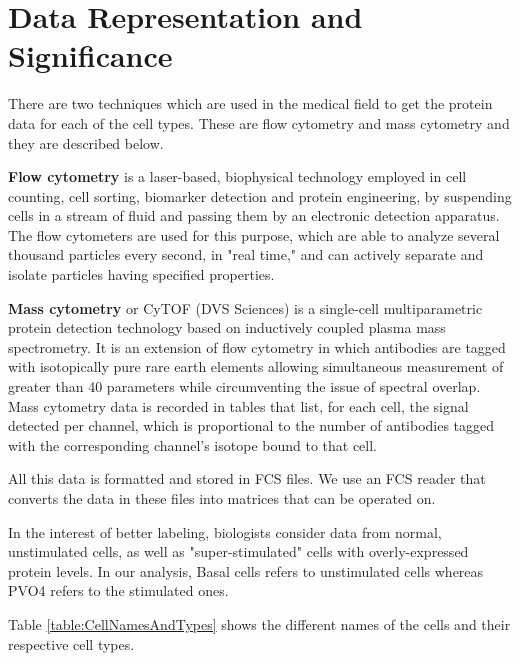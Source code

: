 \documentclass{article} %
\begin{document}
\section{Data Representation and Significance}
\label{datarep}

There are two techniques which are used in the medical field to get the protein data for each of the cell types. These are flow cytometry and mass cytometry and they are described below. 

\textbf{Flow cytometry} is a laser-based, biophysical technology employed in cell counting, cell sorting, biomarker detection and protein engineering, by suspending cells in a stream of fluid and passing them by an electronic detection apparatus. 
The flow cytometers are used for this purpose, which are able to analyze several thousand particles every second, in "real time," and can actively separate and isolate particles having specified properties.

\textbf{Mass cytometry} or CyTOF (DVS Sciences) is a single-cell multiparametric protein detection technology based on inductively coupled plasma mass spectrometry. It is an extension of flow cytometry in which antibodies are tagged with isotopically pure rare earth elements allowing simultaneous measurement of greater than 40 parameters while circumventing the issue of spectral overlap. Mass cytometry data is recorded in tables that list, for each cell, the signal detected per channel, which is proportional to the number of antibodies tagged with the corresponding channel's isotope bound to that cell. 

All this data is formatted and stored in FCS files. We use an FCS reader that converts the data in these files into matrices that can be operated on. 

In the interest of better labeling, biologists consider data from normal, unstimulated cells, as well as "super-stimulated" cells with overly-expressed protein levels. In our analysis, Basal cells refers to unstimulated cells whereas PVO4 refers to the stimulated ones. 

Table \ref{table:CellNamesAndTypes} shows the different names of the cells and their respective cell types. 

\end{document}
